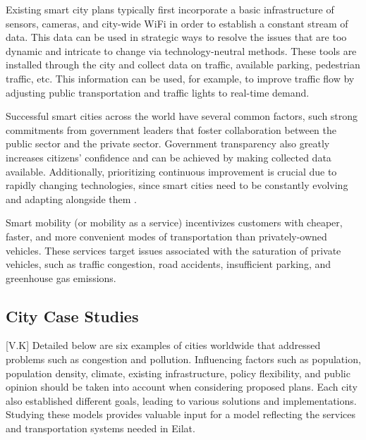 \documentclass[12pt]{article}                       %
\begin{document}
Existing smart city plans typically first incorporate a basic infrastructure of sensors, cameras, and city-wide WiFi in order to establish a constant stream of data. This data can be used in strategic ways to resolve the issues that are too dynamic and intricate to change via technology-neutral methods. These tools are installed through the city and collect data on traffic, available parking, pedestrian traffic, etc. This information can be used, for example, to improve traffic flow by adjusting public transportation and traffic lights to real-time demand.

Successful smart cities across the world have several common factors, such strong commitments from government leaders that foster collaboration between the public sector and the private sector. Government transparency also greatly increases citizens' confidence and can be achieved by making collected data available. Additionally, prioritizing continuous improvement is crucial due to rapidly changing technologies, since smart cities need to be constantly evolving and adapting alongside them \cite{Zanghi2017WhyExamples}. 

Smart mobility (or mobility as a service) incentivizes customers with cheaper, faster, and more convenient modes of transportation than privately-owned vehicles. These services target issues associated with the saturation of private vehicles, such as traffic congestion, road accidents, insufficient parking, and greenhouse gas emissions.

\subsection{City Case Studies}[V.K]
Detailed below are six examples of cities worldwide that addressed problems such as congestion and pollution. Influencing factors such as population, population density, climate, existing infrastructure, policy flexibility, and public opinion should be taken into account when considering proposed plans. Each city also established different goals, leading to various solutions and implementations. Studying these models provides valuable input for a model reflecting the services and transportation systems needed in Eilat.
\end{document}

